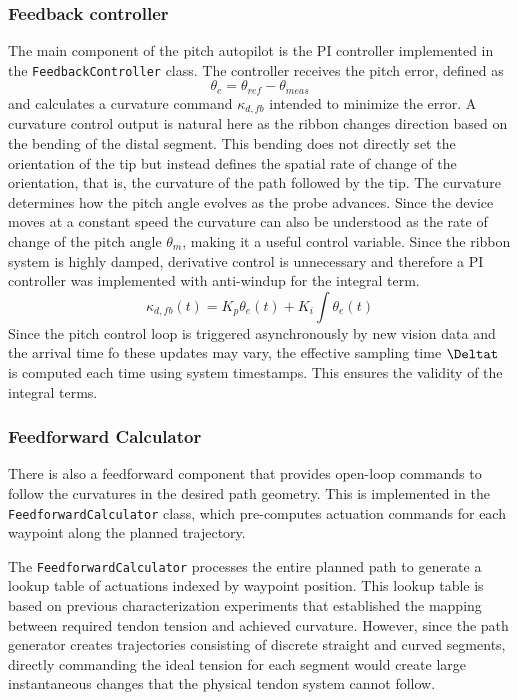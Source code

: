 \subsubsection{Feedback controller}
The main component of the pitch autopilot is the PI controller implemented in the \texttt{FeedbackController} class. The controller receives the pitch error, defined as 
\begin{equation}
    \theta_e = \theta_{ref} - \theta_{meas}
\end{equation}
and calculates a curvature command \(\kappa_{d,fb}\) intended to minimize the error. 
\newline \newline 
A curvature control output is natural here as the ribbon changes direction based on the bending of the distal segment. This bending does not directly set the orientation of the tip but instead defines the spatial rate of change of the orientation, that is, the curvature of the path followed by the tip. The curvature determines how the pitch angle evolves as the probe advances. Since the device moves at a constant speed the curvature can also be understood as the rate of change of the pitch angle \(\theta_m\), making it a useful control variable.
\newline \newline
Since the ribbon system is highly damped, derivative control is unnecessary and therefore a PI controller was implemented with anti-windup for the integral term.
\begin{equation}
    \kappa_{d,fb}(t) = K_p \theta_e(t) + K_i \int \theta_e(t)
\end{equation}
Since the pitch control loop is triggered asynchronously by new vision data and the arrival time fo these updates may vary, the effective sampling time \(\Deltat\) is computed each time using system timestamps. This ensures the validity of the integral terms.

\subsubsection{Feedforward Calculator}
There is also a feedforward component that provides open-loop commands to follow the curvatures in the desired path geometry. This is implemented in the \texttt{FeedforwardCalculator} class, which pre-computes actuation commands for each waypoint along the planned trajectory. 

The \texttt{FeedforwardCalculator} processes the entire planned path to generate a lookup table of actuations indexed by waypoint position. This lookup table is based on previous characterization experiments that established the mapping between required tendon tension and achieved curvature. However, since the path generator creates trajectories consisting of discrete straight and curved segments, directly commanding the ideal tension for each segment would create large instantaneous changes that the physical tendon system cannot follow.

